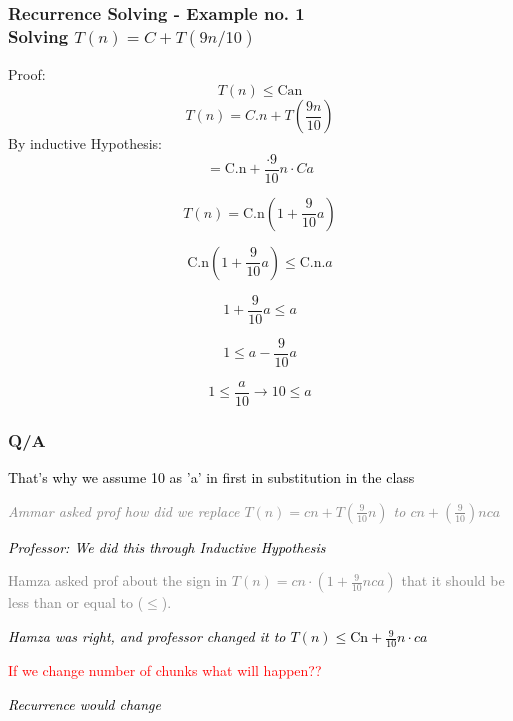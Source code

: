 \begin{frame}
    \frametitle{Recurrence Solving - Example no. 1\\ \small {Solving $T(n) = C + T(9n/10)$}}
    
Proof:
    \[
    {T(n) \leq \text{Can}}
    \]
    \[ {T(n) = C.n +  T( \frac{9n}{10})}
    \]
    By inductive Hypothesis:
    \small
    \[
    = \text{C.n} + \frac{\cdot 9}{10} n \cdot Ca
    \]
    
    \[
    T(n) = \text{C.n}  \left(1 + \frac{9}{10} a\right)
    \]
    
    \[
    \text{C.n}\left(1 + \frac{9}{10} a\right) \leq \text{C.n.}a 
    \]
    
    \[
    1 + \frac{9}{10} a \leq a
    \]
    
    \[
    1 \leq a - \frac{9}{10} a
    \]
    
    \[
    1 \leq \frac{a}{10} \rightarrow       10 \leq a
    \]

\end{frame}

\begin{frame}
    \frametitle{Q/A}
    \vspace{0.4cm} %
    \begin{block}{\textcolor{black}{That's why we assume 10 as 'a' in first in substitution in the class}}
    \end{block}
  
    \textit{\textcolor{gray}{Ammar asked prof how did we replace 
    $T(n) = cn + T \left(\frac{9}{10} n\right)$ to $cn + \left(\frac{9}{10}\right) nca$}}

    \vspace{0.4cm}
    
    \textit{\textcolor{black}{Professor: We did this through Inductive Hypothesis}}
    
    \textcolor{gray}{Hamza asked prof about the sign in 
    $T(n) = cn \cdot \left(1 + \frac{9}{10} nca\right)$ that it should be less than or equal to ($\leq$).}

    \textit{\textcolor{black}{Hamza was right, and professor changed it to $T(n) \leq \text{Cn} + \frac{ 9}{10} n \cdot ca$}}
    
    \begin{block}{\textcolor{red}{If we change number of chunks what will happen??}}
    
    \textit{\textcolor{black}{Recurrence would change}}

    \end{block}
    
\end{frame}




